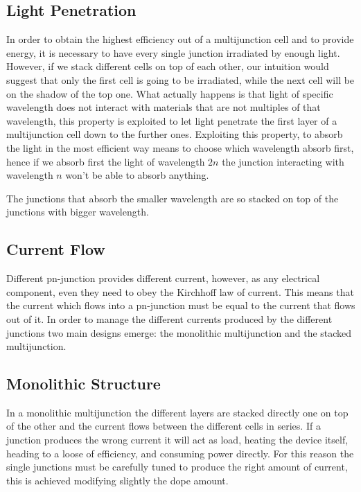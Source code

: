 \documentclass[11pt]{article} %
\begin{document}
\subsection{Light Penetration}

In order to obtain the highest efficiency out of a multijunction cell and to provide energy, it is necessary to have every single junction irradiated by enough light. 
However, if we stack different cells on top of each other, our intuition would suggest that only the first cell is going to be irradiated, while the next cell will be on the shadow of the top one.  
What actually happens is that light of specific wavelength does not interact with materials that are not multiples of that wavelength, this property is exploited to let light penetrate the first layer of a multijunction cell down to the further ones.  Exploiting this property, to absorb the light in the most efficient way means to choose which wavelength absorb first, hence if we absorb first the light of wavelength $2n$ the junction interacting with wavelength $n$ won't be able to absorb anything. 

The junctions that absorb the smaller wavelength are so stacked on top of the junctions with bigger wavelength.  

\subsection{Current Flow}

Different pn-junction provides different current, however, as any electrical component, even they need to obey the Kirchhoff law of current. This means that the current which flows into a pn-junction must be equal to the current that flows out of it.  In order to manage the different currents produced by the different junctions two main designs emerge: the monolithic multijunction and the stacked multijunction. 

\subsection{Monolithic Structure}

In a monolithic multijunction the different layers are stacked directly one on top of the other and the current flows between the different cells in series. If a junction produces the wrong current it will act as load, heating the device itself, heading to a loose of efficiency, and consuming power directly.  For this reason the single junctions must be carefully tuned to produce the right amount of current, this is achieved modifying slightly the dope amount.  
\end{document}
